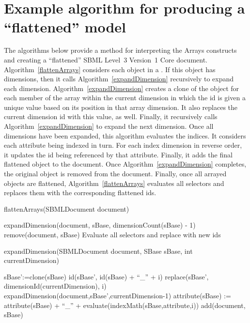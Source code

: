 \section{Example algorithm for producing a ``flattened'' model}
\label{flatten}
The algorithms below provide a method for interpreting the Arrays constructs and creating a ``flattened'' SBML Level~3 Version~1 Core document.  Algorithm~\ref{flattenArrays} considers each \SBase object in a \Model.  If this object has dimensions, then it calls Algorithm~\ref{expandDimension} recursively to expand each dimension.  Algorithm~\ref{expandDimension} creates a clone of the object for each member of the array within the current dimension in which the id is given a unique value based on its position in that array dimension.  It also replaces the current dimension id with this value, as well.  Finally, it recursively calls Algorithm~\ref{expandDimension} to expand the next dimension.  Once all dimensions have been expanded, this algorithm evaluates the indices.  It considers each attribute being indexed in turn.  For each index dimension in reverse order, it updates the id being referenced by that attribute.  Finally, it adds the final flattened object to the document.  Once Algorithm~\ref{expandDimension} completes, the original object is removed from the document.  Finally, once all arrayed objects are flattened, Algorithm~\ref{flattenArrays} evaluates all selectors and replaces them with the corresponding flattened ids.

\begin{algorithm}[ht]
\label{flattenArrays}
  \caption{flattenArrays(SBMLDocument document)}
{
        {
          expandDimension(document, sBase, dimensionCount(sBase) - 1)\;
          remove(document, sBase)\;
        }
}
Evaluate all selectors and replace with new ids\;
\end{algorithm}

\begin{algorithm}[ht]
\label{expandDimension}
  \caption{expandDimension(SBMLDocument document, SBase sBase, int currentDimension)}
       {
                {
                        sBase':=clone(sBase)\;
                        id(sBase', id(sBase) + ``\_'' + i)\;
                        replace(sBase', dimensionId(currentDimension), i)\;
                        expandDimension(document,sBase',currentDimension-1)\;
               }
     }
     \Else
     {
                {
                        {
                           attribute(sBase) := attribute(sBase) + ``\_'' + evaluate(indexMath(sBase,attribute,i))\;
                        }
                }
                add(document, sBase)\;
     }
\end{algorithm}

